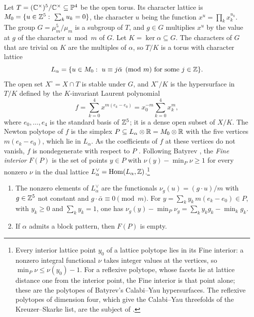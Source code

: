 Let $T=(\mathbb{C}^{\times})^{5}/\mathbb{C}^{\times}\subseteq\mathbb{P}^{4}$ be the open torus.
Its character lattice is $M_{0}=\{u\in\mathbb{Z}^{5}:\ \sum_{k}u_{k}=0\}$, the
character $u$ being the function $x^{u}=\prod_{k}x_{k}^{u_{k}}$. The group
$G=\mu_{m}^{5}/\mu_{m}$ is a subgroup of $T$, and $g\in G$ multiplies $x^{u}$
by the value at $g$ of the character $u\bmod m$ of $G$. Let $K=\ker\alpha
\subseteq G$. The characters of $G$ that are trivial on $K$ are the multiples
of $\alpha$, so $T/K$ is a torus with character lattice
\[
  L_{\alpha}=\{u\in M_{0}:\ u\equiv j\bar\alpha\pmod m\ \text{for some}\
  j\in\mathbb{Z}\}.
\]
The open set $X^{\circ}=X\cap T$ is stable under $G$, and $X^{\circ}/K$ is
the hypersurface in $T/K$ defined by the $K$-invariant Laurent polynomial
\[
  f=\sum_{k=0}^{4}x^{m(e_{k}-e_{0})}=x_{0}^{-m}\sum_{k=0}^{4}x_{k}^{m},
\]
where $e_{0},\dots,e_{4}$ is the standard basis of $\mathbb{Z}^{5}$; it is a dense
open subset of $X/K$. The Newton polytope of $f$ is the simplex
$P\subseteq L_{\alpha}\otimes\mathbb{R}=M_{0}\otimes\mathbb{R}$ with the five vertices
$m(e_{k}-e_{0})$, which lie in $L_{\alpha}$. As the coefficients of $f$ at
these vertices do not vanish, $f$ is nondegenerate with respect to $P$
\cite[Example~5.2]{Bat24}. Following Batyrev \cite[Definition~1.2]{Bat24},
the \emph{Fine interior} $F(P)$ is the set of points $y\in P$ with
$\nu(y)-\min_{P}\nu\ge1$ for every nonzero $\nu$ in the dual lattice
$L_{\alpha}^{\vee}=\operatorname{Hom}(L_{\alpha},\mathbb{Z})$.\footnote{Every interior
lattice point $y_{0}$ of a lattice polytope lies in its Fine interior: a
nonzero integral functional $\nu$ takes integer values at the vertices, so
$\min_{P}\nu\le\nu(y_{0})-1$. For a reflexive polytope, whose facets lie at
lattice distance one from the interior point, the Fine interior is that
point alone; these are the polytopes of Batyrev's Calabi--Yau hypersurfaces.
The reflexive polytopes of dimension four, which give the Calabi--Yau
threefolds of the Kreuzer--Skarke list, are the subject of
\cite{BhaKS26}.}

\begin{lemma}\label{lem:fine}
\begin{enumerate}[label=\textup{(\alph*)}]
\item The nonzero elements of $L_{\alpha}^{\vee}$ are the functionals
$\nu_{g}(u)=(g\cdot u)/m$ with $g\in\mathbb{Z}^{5}$ not constant and
$g\cdot\bar\alpha\equiv0\pmod m$. For $y=\sum_{k}y_{k}\,m(e_{k}-e_{0})\in P$,
with $y_{k}\ge0$ and $\sum_{k}y_{k}=1$, one has
$\nu_{g}(y)-\min_{P}\nu_{g}=\sum_{k}y_{k}g_{k}-\min_{k}g_{k}$.
\item If $\alpha$ admits a block pattern, then $F(P)$ is empty.
\end{enumerate}
\end{lemma}

